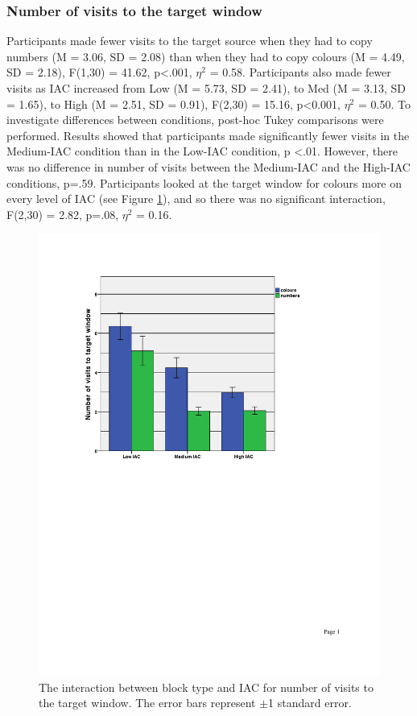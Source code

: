 \documentclass[11pt,oneside]{report}
\begin{document}
\begin{table}
\subsubsection{Number of visits to the target window}
Participants made fewer visits to the target source when they had to copy numbers (M = 3.06, SD = 2.08) than when they had to copy colours (M = 4.49, SD = 2.18), F(1,30) = 41.62, p<.001, $\eta^2$  = 0.58. Participants also made fewer visits as IAC increased from Low (M = 5.73, SD = 2.41), to Med (M = 3.13, SD = 1.65), to High (M = 2.51, SD = 0.91), F(2,30) = 15.16, p<0.001, $\eta^2$  = 0.50. To investigate differences between conditions, post-hoc Tukey comparisons were performed. Results showed that participants made significantly fewer visits in the Medium-IAC condition than in the Low-IAC condition, p <.01. However, there was no difference in number of visits between the Medium-IAC and the High-IAC conditions, p=.59. Participants looked at the target window for colours more on every level of IAC (see Figure \ref{fig:ch4_noVisits}), and so there was no significant interaction, F(2,30) = 2.82, p=.08, $\eta^2$  = 0.16. 

\begin{figure}[!ht]
\centering
\includegraphics[width=\textwidth]{images/Study2/ch4_noVisits-bargraph.pdf}
\caption{The interaction between block type and IAC for number of visits to the target window. The error bars represent $\pm $1 standard error.}
\vspace{-9pt}
\label{fig:ch4_noVisits}
\end{figure}


\end{table}
\end{document}
